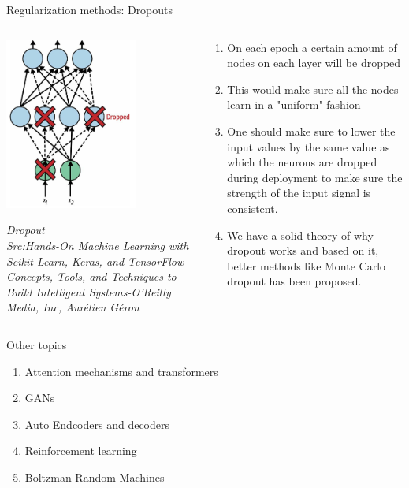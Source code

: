 \begin{frame}{Regularization methods: Dropouts}
	\begin{columns}[T]
        \begin{column}{0.4\textwidth}
        	\begin{center}
				\includegraphics[width=0.7\textwidth]{images/dropout.png}
			\end{center}
			\tiny{\textit{Dropout\\Src:Hands-On Machine Learning with Scikit-Learn, Keras, and TensorFlow  Concepts, Tools, and Techniques to Build Intelligent Systems-O'Reilly Media, Inc, Aurélien Géron }}
        \end{column}
		\begin{column}{0.6\textwidth}
			\begin{enumerate}[$\bullet$]
				\item On each epoch a certain amount of nodes on each layer will be dropped\pause
				\item This would make sure all the nodes learn in a "uniform" fashion\pause
				\item One should make sure to lower the input values by the same value as which the neurons are dropped during deployment to make sure the strength of the input signal is consistent.\pause
				\item We have a solid theory of why dropout works and based on it, better methods like Monte Carlo dropout has been proposed.
			\end{enumerate}
		\end{column} 
    \end{columns}
\end{frame}

\begin{frame}{Other topics}
	\begin{enumerate}[$\bullet$]
		\item Attention mechanisms and transformers\pause
		\item GANs\pause
		\item Auto Endcoders and decoders\pause
		\item Reinforcement learning\pause
		\item Boltzman Random Machines\pause
	\end{enumerate}
\end{frame}